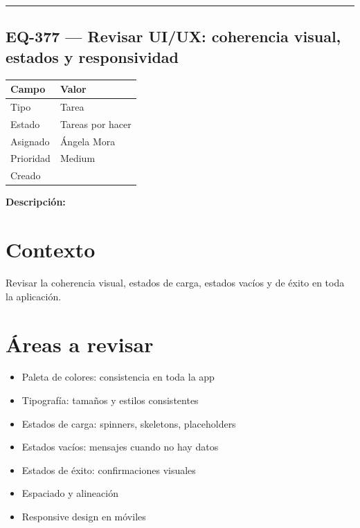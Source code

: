 \documentclass[
  spanish,
  11pt,
]{report}
\newcounter{none} %
\providecommand{\tightlist}{%
  \setlength{\itemsep}{0pt}\setlength{\parskip}{0pt}}
\begin{document}
\begin{center}\rule{0.5\linewidth}{0.5pt}\end{center}

\subsection{EQ-377 --- Revisar UI/UX: coherencia visual, estados y
responsividad}\label{eq-377-revisar-uiux-coherencia-visual-estados-y-responsividad}

{\def\LTcaptype{none} %
\begin{longtable}[]{@{}ll@{}}
\toprule\noalign{}
Campo & Valor \\
\midrule\noalign{}
\endhead
\bottomrule\noalign{}
\endlastfoot
Tipo & Tarea \\
Estado & Tareas por hacer \\
Asignado & Ángela Mora \\
Prioridad & Medium \\
Creado & \\
\end{longtable}
}

\textbf{Descripción:}

\section{Contexto}\label{contexto-15}

Revisar la coherencia visual, estados de carga, estados vacíos y de
éxito en toda la aplicación.

\section{Áreas a revisar}\label{uxe1reas-a-revisar-1}

\begin{itemize}
\tightlist
\item
  Paleta de colores: consistencia en toda la app
\item
  Tipografía: tamaños y estilos consistentes
\item
  Estados de carga: spinners, skeletons, placeholders
\item
  Estados vacíos: mensajes cuando no hay datos
\item
  Estados de éxito: confirmaciones visuales
\item
  Espaciado y alineación
\item
  Responsive design en móviles
\end{itemize}
\end{document}
